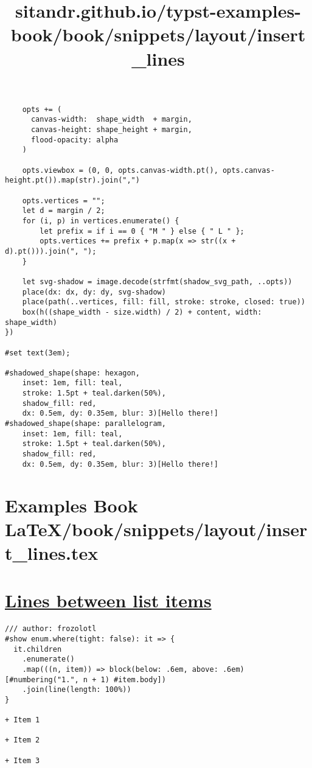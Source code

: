 \begin{verbatim}
    opts += (
      canvas-width:  shape_width  + margin,
      canvas-height: shape_height + margin,
      flood-opacity: alpha
    )

    opts.viewbox = (0, 0, opts.canvas-width.pt(), opts.canvas-height.pt()).map(str).join(",")

    opts.vertices = "";
    let d = margin / 2;
    for (i, p) in vertices.enumerate() {
        let prefix = if i == 0 { "M " } else { " L " };
        opts.vertices += prefix + p.map(x => str((x + d).pt())).join(", ");
    }

    let svg-shadow = image.decode(strfmt(shadow_svg_path, ..opts))
    place(dx: dx, dy: dy, svg-shadow)
    place(path(..vertices, fill: fill, stroke: stroke, closed: true))
    box(h((shape_width - size.width) / 2) + content, width: shape_width)
})

#set text(3em);

#shadowed_shape(shape: hexagon,
    inset: 1em, fill: teal,
    stroke: 1.5pt + teal.darken(50%),
    shadow_fill: red,
    dx: 0.5em, dy: 0.35em, blur: 3)[Hello there!]
#shadowed_shape(shape: parallelogram,
    inset: 1em, fill: teal,
    stroke: 1.5pt + teal.darken(50%),
    shadow_fill: red,
    dx: 0.5em, dy: 0.35em, blur: 3)[Hello there!]
\end{verbatim}

\pandocbounded{}


\section{Examples Book LaTeX/book/snippets/layout/insert_lines.tex}
\title{sitandr.github.io/typst-examples-book/book/snippets/layout/insert_lines}

\section{\texorpdfstring{\hyperref[lines-between-list-items]{Lines
between list
items}}{Lines between list items}}\label{lines-between-list-items}

\begin{verbatim}
/// author: frozolotl
#show enum.where(tight: false): it => {
  it.children
    .enumerate()
    .map(((n, item)) => block(below: .6em, above: .6em)[#numbering("1.", n + 1) #item.body])
    .join(line(length: 100%))
}

+ Item 1

+ Item 2

+ Item 3
\end{verbatim}

